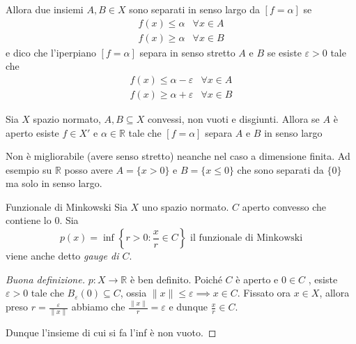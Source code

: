 Allora due insiemi \(A, B \in X\) sono separati in senso largo da \([f = \alpha]\) se
\begin{align*}
    f{(x)} \le \alpha & \forall x \in A \\
    f{(x)} \ge \alpha & \forall x \in B
\end{align*}
e dico che l'iperpiano \([f = \alpha]\) separa in senso stretto \(A\) e \(B\) se
esiste \(\varepsilon > 0\) tale che
\begin{align*}
    f{(x)} \le \alpha - \varepsilon & \forall x \in A \\
    f{(x)} \ge \alpha + \varepsilon & \forall x \in B
\end{align*}
\begin{theorem}
    Sia \(X\) spazio normato, \(A, B \subseteq X \) convessi, non vuoti e
    disgiunti. Allora se \(A\) è aperto esiste \(f \in X'\) e \(\alpha \in \mathbb{R}\)  tale che \([f = \alpha]\) separa \(A\) e \(B\) in senso largo
\end{theorem}
\begin{remark}{}
    Non è migliorabile (avere senso stretto) neanche nel caso a dimensione
    finita. Ad esempio su \(\mathbb{R}\) posso avere \(A=\{x >0\} \) e \(B=\{ x \le 0\}\) che sono separati da \( \{0\} \) ma solo in senso largo.
\end{remark}
\begin{definition}{Funzionale di Minkowski}
    Sia \(X\) uno spazio normato. \(C\) aperto convesso che contiene lo 0. Sia
    \[
      p{(x)} = \inf \left\{ r > 0 : \frac{x}{r} \in C\right\}  \text{ il funzionale di
      Minkowski}
    \]
    viene anche detto \emph{gauge di \(C\)}.
\end{definition}
\begin{proof}[Buona definizione]
    \(p : X \to \mathbb{R}\) è ben definito. Poiché \(C\) è aperto e \(0 \in C\) , esiste \(\varepsilon > 0\) tale che \(B_\varepsilon {(0)} \subseteq C \), ossia \(\|x\| \le \varepsilon \implies x \in C\).
    Fissato ora \(x \in X\), allora preso \(r = \frac{\varepsilon}{\|x\|}\)
    abbiamo che \(\frac{\|x\|}{r} = \varepsilon \) e dunque \(\frac{x}{r} \in C\).

    Dunque l'insieme di cui si fa l'inf è non vuoto.
\end{proof}

